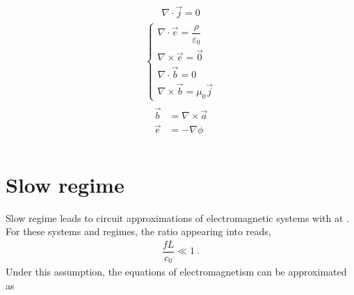 \documentclass[letterpaper,10pt,english]{jupyterBook}
\begin{document}
\sphinxAtStartPar
{}
\begin{equation*}
\begin{split}\nabla \cdot \vec{j} = 0\end{split}
\end{equation*}
\sphinxAtStartPar
{}
\begin{equation*}
\begin{split}\begin{cases}
    \nabla \cdot \vec{e} = \dfrac{\rho}{\varepsilon_0} \\
    \nabla \times \vec{e} = \vec{0} \\ 
    \nabla \cdot \vec{b} = 0 \\
    \nabla \times \vec{b} = \mu_0 \vec{j} 
  \end{cases}\end{split}
\end{equation*}
\sphinxAtStartPar
{}
\begin{equation*}
\begin{split}\begin{aligned}
      \vec{b} & = \nabla \times \vec{a} \\
      \vec{e} & = - \nabla \phi \\
   \end{aligned}\end{split}
\end{equation*}
\sphinxstepscope


\section{Slow regime}
\label{\detokenize{ch/regimes-slow:slow-regime}}\label{\detokenize{ch/regimes-slow:classical-electromagnetism-regimes-slow}}\label{\detokenize{ch/regimes-slow::doc}}
\sphinxAtStartPar
Slow regime leads to circuit approximations of electromagnetic systems with  at . For these systems and regimes, the ratio appearing into {\hyperref[\detokenize{ch/regimes-non-dimensional:classical-electromagnetism-regimes-non-dimensional}]{}} reads,
\begin{equation*}
\begin{split}\dfrac{f L }{c_0} \ll 1 \ .\end{split}
\end{equation*}
\sphinxAtStartPar
Under this assumption, the equations of electromagnetism can be approximated as
\end{document}
